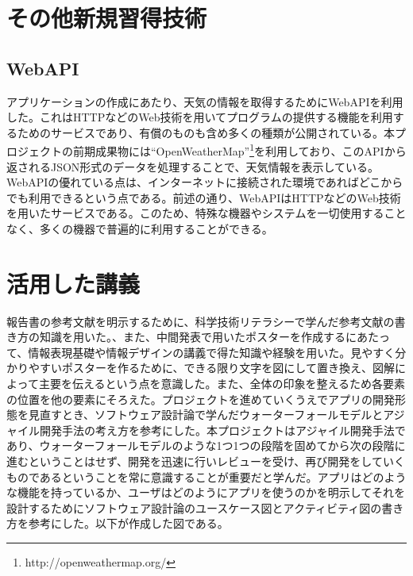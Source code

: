 \documentclass[openany,11pt,papersize]{jsbook}
\begin{document}
\begin{appendix}
\chapter{その他新規習得技術}
\section{WebAPI}
アプリケーションの作成にあたり、天気の情報を取得するためにWebAPIを利用した。これはHTTPなどのWeb技術を用いてプログラムの提供する機能を利用するためのサービスであり、有償のものも含め多くの種類が公開されている。本プロジェクトの前期成果物には``OpenWeatherMap''\footnote{http://openweathermap.org/}を利用しており、このAPIから返されるJSON形式のデータを処理することで、天気情報を表示している。WebAPIの優れている点は、インターネットに接続された環境であればどこからでも利用できるという点である。前述の通り、WebAPIはHTTPなどのWeb技術を用いたサービスである。このため、特殊な機器やシステムを一切使用することなく、多くの機器で普遍的に利用することができる。

\chapter{活用した講義}
 報告書の参考文献を明示するために、科学技術リテラシーで学んだ参考文献の書き方の知識を用いた。、また、中間発表で用いたポスターを作成するにあたって、情報表現基礎や情報デザインの講義で得た知識や経験を用いた。見やすく分かりやすいポスターを作るために、できる限り文字を図にして置き換え、図解によって主要を伝えるという点を意識した。また、全体の印象を整えるため各要素の位置を他の要素にそろえた。プロジェクトを進めていくうえでアプリの開発形態を見直すとき、ソフトウェア設計論で学んだウォーターフォールモデルとアジャイル開発手法の考え方を参考にした。本プロジェクトはアジャイル開発手法であり、ウォーターフォールモデルのような1つ1つの段階を固めてから次の段階に進むということはせず、開発を迅速に行いレビューを受け、再び開発をしていくものであるということを常に意識することが重要だと学んだ。アプリはどのような機能を持っているか、ユーザはどのようにアプリを使うのかを明示してそれを設計するためにソフトウェア設計論のユースケース図とアクティビティ図の書き方を参考にした。以下が作成した図である。



\end{appendix}
\end{document}
